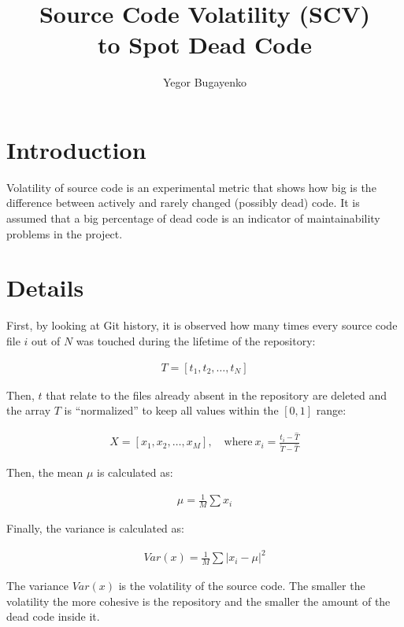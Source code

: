 \documentclass[12pt]{article}
\begin{document}
\title{Source Code Volatility (SCV)\\to Spot Dead Code}
\author{Yegor Bugayenko}
\maketitle

\section{Introduction}

Volatility of source code is an experimental metric that
shows how big is the difference between actively and rarely changed (possibly dead)
code. It is assumed that a big percentage of dead code is
an indicator of maintainability problems in the project.

\section{Details}

First, by looking at Git history,
it is observed how many times every source code file $i$ out of $N$ was touched
during the lifetime of the repository:

\begin{eqnarray}
T = [t_1, t_2, \dots, t_N]
\end{eqnarray}

Then, $t$ that relate to the files already absent in the
repository are deleted and the array $T$ is ``normalized''
to keep all values within the $[0,1]$ range:

\begin{eqnarray}
X = [x_1, x_2, \dots, x_M],\quad \text{where}\ x_i = \frac{t_i - \hat{T}}{\check{T} - \hat{T}}
\end{eqnarray}

Then, the mean $\mu$ is calculated as:

\begin{eqnarray}
\mu = \frac{1}{M}\sum{x_i}
\end{eqnarray}

Finally, the variance is calculated as:

\begin{eqnarray}
Var(x) = \frac{1}{M}\sum{|x_i - \mu|^2}
\end{eqnarray}

The variance $Var(x)$ is the volatility of the source code. The smaller
the volatility the more cohesive is the repository and the smaller
the amount of the dead code inside it.
\end{document}
